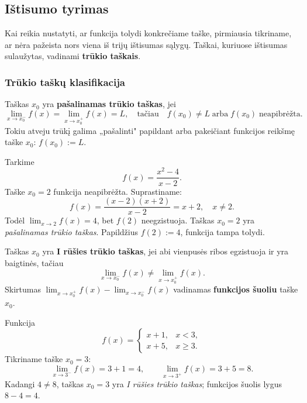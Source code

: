\subsection{Ištisumo tyrimas}

Kai reikia nustatyti, ar funkcija tolydi konkrečiame taške, pirmiausia
tikriname, ar nėra pažeista nors viena iš trijų ištisumas sąlygų.
Taškai, kuriuose ištisumas sulaužytas, vadinami \textbf{trūkio taškais}.

\subsubsection*{Trūkio taškų klasifikacija}

\begin{definition}
Taškas $x_0$ yra \textbf{pašalinamas trūkio taškas}, jei
\[
    \lim_{x\to x_0^-}f(x)=\lim_{x\to x_0^+}f(x)=L,
    \quad \text{tačiau}\quad f(x_0)\neq L
    \;\text{arba}\; f(x_0) \;\text{neapibrėžta.}
\]
Tokiu atveju trūkį galima „pašalinti" papildant arba pakeičiant funkcijos
reikšmę taške $x_0$: $f(x_0):=L$.
\end{definition}

\begin{example}
Tarkime
\[
  f(x)=\frac{x^2-4}{x-2}.
\]
Taške $x_0=2$ funkcija neapibrėžta. Suprastiname:
\[
  f(x)=\frac{(x-2)(x+2)}{x-2}=x+2,\quad x\neq 2.
\]
Todėl $\lim_{x\to 2}f(x)=4$, bet $f(2)$ neegzistuoja. Taškas $x_0=2$ yra
\textit{pašalinamas trūkio taškas}. Papildžius $f(2):=4$, funkcija tampa
tolydi.
\end{example}

\begin{definition}
Taškas $x_0$ yra \textbf{I rūšies trūkio taškas}, jei abi vienpusės ribos
egzistuoja ir yra baigtinės, tačiau
\[
    \lim_{x\to x_0^-}f(x)\neq\lim_{x\to x_0^+}f(x).
\]
Skirtumas $\lim_{x\to x_0^+}f(x)-\lim_{x\to x_0^-}f(x)$ vadinamas
\textbf{funkcijos šuoliu} taške $x_0$.
\end{definition}

\begin{example}
Funkcija
\[
  f(x)=
  \begin{cases}
    x+1, & x<3,\\
    x+5, & x\geq 3.
  \end{cases}
\]
Tikriname taške $x_0=3$:
\[
  \lim_{x\to 3^-}f(x)=3+1=4,\qquad
  \lim_{x\to 3^+}f(x)=3+5=8.
\]
Kadangi $4\neq 8$, taškas $x_0=3$ yra \textit{I rūšies trūkio taškas};
funkcijos šuolis lygus $8-4=4$.
\end{example}

